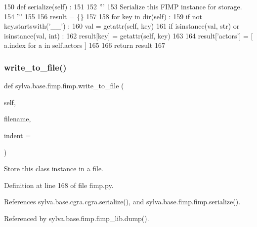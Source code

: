 \begin{DoxyCode}
150     \textcolor{keyword}{def }serialize(self) :
151 
152       \textcolor{stringliteral}{'''}
153 \textcolor{stringliteral}{        Serialize this FIMP instance for storage.}
154 \textcolor{stringliteral}{      '''}
155 
156       result = \{\}
157 
158       \textcolor{keywordflow}{for} key \textcolor{keywordflow}{in} dir(self) :
159         \textcolor{keywordflow}{if} \textcolor{keywordflow}{not} key.startswith(\textcolor{stringliteral}{'\_\_'}) :
160           val = getattr(self, key)
161           \textcolor{keywordflow}{if} isinstance(val, str) \textcolor{keywordflow}{or} isinstance(val, int) :
162             result[key] = getattr(self, key)
163 
164       result[\textcolor{stringliteral}{'actors'}] = [ a.index \textcolor{keywordflow}{for} a \textcolor{keywordflow}{in} self.actors ]
165 
166       \textcolor{keywordflow}{return} result
167 
\end{DoxyCode}
\mbox{\label{classsylva_1_1base_1_1fimp_1_1fimp_adbad0036657c94fba81656b44e134658}} 
\subsubsection{\texorpdfstring{write\+\_\+to\+\_\+file()}{write\_to\_file()}}
{\footnotesize\ttfamily def sylva.\+base.\+fimp.\+fimp.\+write\+\_\+to\+\_\+file (\begin{DoxyParamCaption}\item[{}]{self,  }\item[{}]{filename,  }\item[{}]{indent = {} }\end{DoxyParamCaption})}

\begin{DoxyVerb}  Store this class instance in a file.
\end{DoxyVerb}
 

Definition at line 168 of file fimp.\+py.



References sylva.\+base.\+cgra.\+cgra.\+serialize(), and sylva.\+base.\+fimp.\+fimp.\+serialize().



Referenced by sylva.\+base.\+fimp.\+fimp\+\_\+lib.\+dump().


